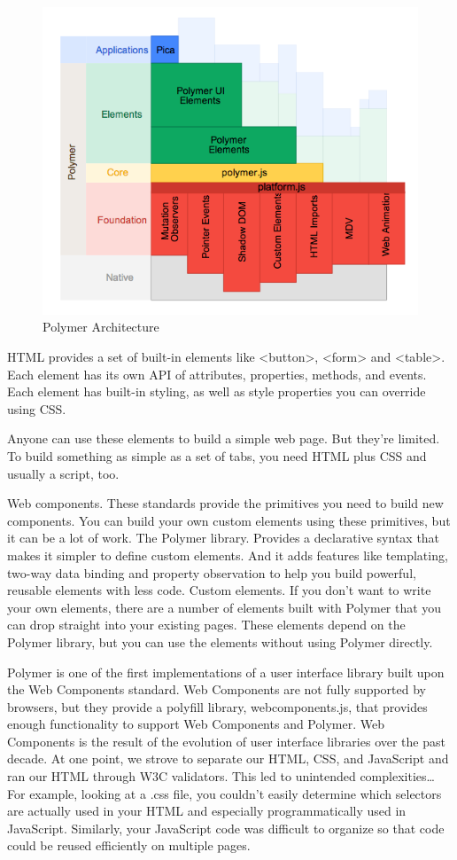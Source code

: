 \begin {figure}[h]
\graphicspath{{images/chapter_TCH/}}
\includegraphics[width=\textwidth]{polymer_1}
\caption{Polymer Architecture}
\end {figure}


HTML provides a set of built-in elements like <button>, <form> and <table>. Each element has its own API of attributes, properties, methods, and events. Each element has built-in styling, as well as style properties you can override using CSS.

Anyone can use these elements to build a simple web page. But they’re limited. To build something as simple as a set of tabs, you need HTML plus CSS and usually a script, too.

Web components. These standards provide the primitives you need to build new components. You can build your own custom elements using these primitives, but it can be a lot of work.
The Polymer library. Provides a declarative syntax that makes it simpler to define custom elements. And it adds features like templating, two-way data binding and property observation to help you build powerful, reusable elements with less code.
Custom elements. If you don’t want to write your own elements, there are a number of elements built with Polymer that you can drop straight into your existing pages. These elements depend on the Polymer library, but you can use the elements without using Polymer directly.

Polymer is one of the first implementations of a user interface library built upon the Web Components standard.  Web Components are not fully supported by browsers, but they provide a polyfill library, webcomponents.js, that provides enough functionality to support Web Components and Polymer.
Web Components is the result of the evolution of user interface libraries over the past decade.  At one point, we strove to separate our HTML, CSS, and JavaScript and ran our HTML through W3C validators. This led to unintended complexities…  For example, looking at a .css file, you couldn’t easily determine which selectors are actually used in your HTML and especially programmatically used in JavaScript.  Similarly, your JavaScript code was difficult to organize so that code could be reused efficiently on multiple pages.
